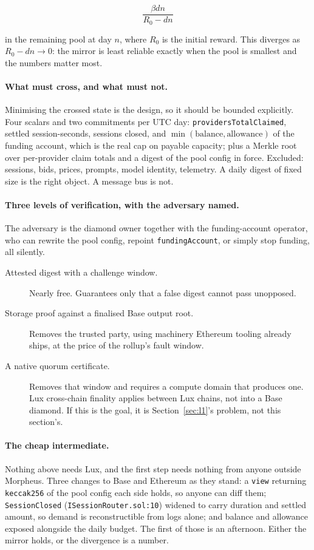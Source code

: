 \documentclass[11pt,a4paper]{article}
\newcommand{\code}[1]{\texttt{\small #1}}
\begin{document}
\[
  \frac{\beta d n}{R_0 - d n}
\]

\noindent
in the remaining pool at day $n$, where $R_0$ is the initial reward. This
diverges as $R_0 - dn \to 0$: the mirror is least reliable exactly when the pool
is smallest and the numbers matter most.

\paragraph{What must cross, and what must not.} Minimising the crossed state is
the design, so it should be bounded explicitly. Four scalars and two commitments
per UTC day: \code{providersTotalClaimed}, settled session-seconds, sessions
closed, and $\min(\text{balance}, \text{allowance})$ of the funding account,
which is the real cap on payable capacity; plus a Merkle root over per-provider
claim totals and a digest of the pool config in force. Excluded: sessions, bids,
prices, prompts, model identity, telemetry. A daily digest of fixed size is the
right object. A message bus is not.

\paragraph{Three levels of verification, with the adversary named.} The
adversary is the diamond owner together with the funding-account operator, who
can rewrite the pool config, repoint \code{fundingAccount}, or simply stop
funding, all silently.

\begin{description}
\item[Attested digest with a challenge window.] Nearly free. Guarantees only
that a false digest cannot pass unopposed.
\item[Storage proof against a finalised Base output root.] Removes the trusted
party, using machinery Ethereum tooling already ships, at the price of the
rollup's fault window.
\item[A native quorum certificate.] Removes that window and requires a compute
domain that produces one. Lux cross-chain finality applies between Lux chains,
not into a Base diamond. If this is the goal, it is Section~\ref{sec:l1}'s
problem, not this section's.
\end{description}

\paragraph{The cheap intermediate.} Nothing above needs Lux, and the first step
needs nothing from anyone outside Morpheus. Three changes to Base and Ethereum
as they stand: a \code{view} returning \code{keccak256} of the pool config each
side holds, so anyone can diff them; \code{SessionClosed}
(\code{ISessionRouter.sol:10}) widened to carry duration and settled amount, so
demand is reconstructible from logs alone; and balance and allowance exposed
alongside the daily budget. The first of those is an afternoon. Either the
mirror holds, or the divergence is a number.
\end{document}
